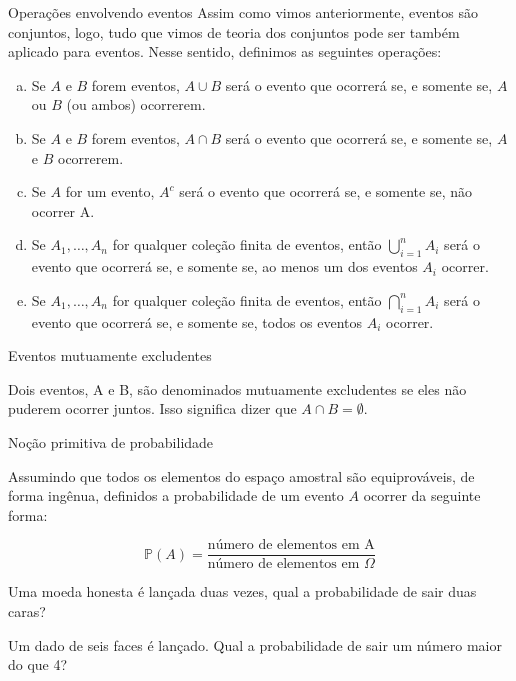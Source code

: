 \begin{frame}{Operações envolvendo eventos}
    Assim como vimos anteriormente, eventos são conjuntos, logo, tudo que vimos de teoria dos conjuntos pode ser também aplicado para eventos. Nesse sentido, definimos as seguintes operações:
    \begin{enumerate}[a)] %
        \item Se $A$ e $B$ forem eventos, $A \cup B$ será o evento que ocorrerá se, e somente se, $A$ ou $B$ (ou ambos) ocorrerem.
        \pause
        \item Se $A$ e $B$ forem eventos, $A \cap B$ será o evento que ocorrerá se, e somente se, $A$ e $B$ ocorrerem.
        \pause
        \item Se $A$ for um evento, $A^c$ será o evento que ocorrerá se, e somente se, não ocorrer A.
        \pause
        \item Se $A_1, \dots, A_n$ for qualquer coleção finita de eventos, então $\displaystyle\bigcup_{i=1}^n A_i$ será o evento que ocorrerá se, e somente se, ao menos um dos eventos $A_i$ ocorrer. 
        \pause
        \item Se $A_1, \dots, A_n$ for qualquer coleção finita de eventos, então $\displaystyle\bigcap_{i=1}^n A_i$ será o evento que ocorrerá se, e somente se, todos os eventos $A_i$ ocorrer. 
    \end{enumerate}
\end{frame}

\begin{frame}{Eventos mutuamente excludentes}

Dois eventos, A e B, são denominados mutuamente excludentes se eles não puderem ocorrer juntos. Isso significa dizer que $A\cap B = \emptyset$.

\end{frame}

\begin{frame}{Noção primitiva de probabilidade}

Assumindo que todos os elementos do espaço amostral são equiprováveis, de forma ingênua, definidos a probabilidade de um evento $A$ ocorrer da seguinte forma:

$$\mathds{P}(A) = \dfrac{\text{número de elementos em A}}{\text{número de elementos em }  \Omega} $$

\pause
\begin{exemplo}
    Uma moeda honesta é lançada duas vezes, qual a probabilidade de sair duas caras?
\end{exemplo}

\pause 
\begin{exemplo}
    Um dado de seis faces é lançado. Qual a probabilidade de sair um número maior do que 4? 
\end{exemplo}

\end{frame}

